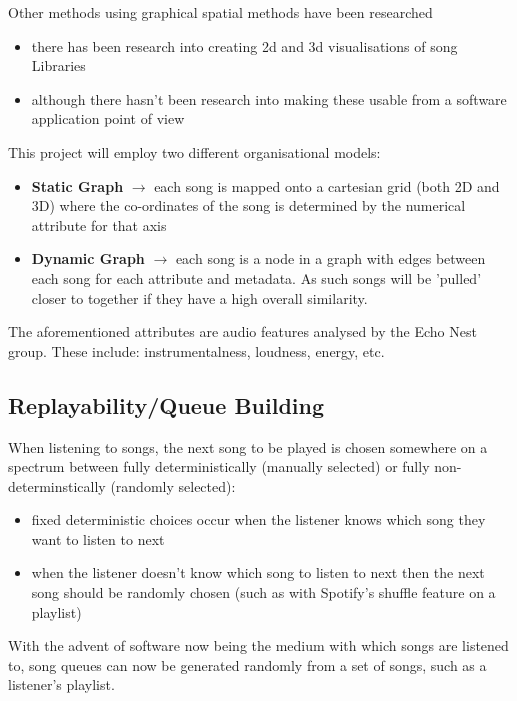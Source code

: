Other methods using graphical spatial methods have been researched\begin{itemize}
    \item there has been research into creating 2d and 3d visualisations of song Libraries
    \item although there hasn't been research into making these usable from a software application point of view
\end{itemize}

This project will employ two different organisational models:\begin{itemize}
    \item \textbf{Static Graph} \(\to\) each song is mapped onto a cartesian grid (both 2D and 3D) where the co-ordinates of the song is determined by the numerical attribute for that axis
    \item \textbf{Dynamic Graph} \(\to\) each song is a node in a graph with edges between each song for each attribute and metadata. As such songs will be 'pulled' closer to together if they have a high overall similarity.
\end{itemize}

The aforementioned attributes are audio features analysed by the Echo Nest group. These include: instrumentalness, loudness, energy, etc.

\subsection{Replayability/Queue Building}
When listening to songs, the next song to be played is chosen somewhere on a spectrum between fully deterministically (manually selected) or fully non-determinstically (randomly selected):\begin{itemize}
    \item fixed deterministic choices occur when the listener knows which song they want to listen to next
    \item when the listener doesn't know which song to listen to next then the next song should be randomly chosen (such as with Spotify's shuffle feature on a playlist)
\end{itemize}

With the advent of software now being the medium with which songs are listened to, song queues can now be generated randomly from a set of songs, such as a listener's playlist.


